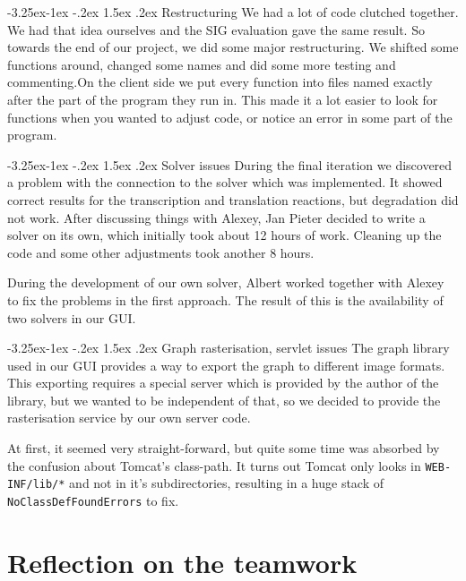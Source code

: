 \documentclass[a4paper]{article}
\makeatletter
\renewcommand\paragraph{\@startsection{paragraph}{4}{\z@}%
  {-3.25ex\@plus -1ex \@minus -.2ex}%
  {1.5ex \@plus .2ex}%
  {\normalfont\normalsize\bfseries}}
\makeatother
\begin{document}
\paragraph{Restructuring}
We had a lot of code clutched together. We had that idea ourselves and the SIG evaluation gave the same result. So towards the end of our project, we did some major restructuring. We shifted some functions around, changed some names and did some more testing and commenting.On the client side we put every function into files named exactly after the part of the program they run in. This made it a lot easier to look for functions when you wanted to adjust code, or notice an error in some part of the program. 

\paragraph{Solver issues}
During the final iteration we discovered a problem with the connection to the solver which was implemented. It showed correct results for the transcription and translation reactions, but degradation did not work. After discussing things with Alexey, Jan Pieter decided to write a solver on its own, which initially took about 12 hours of work. Cleaning up the code and some other adjustments took another 8 hours.

During the development of our own solver, Albert worked together with Alexey to fix the problems in the first approach. The result of this is the availability of two solvers in our GUI.

\paragraph{Graph rasterisation, servlet issues}
The graph library used in our GUI provides a way to export the graph to different image formats. This exporting requires a special server which is provided by the author of the library, but we wanted to be independent of that, so we decided to provide the rasterisation service by our own server code.

At first, it seemed very straight-forward, but quite some time was absorbed by the confusion about Tomcat's class-path. It turns out Tomcat only looks in \verb|WEB-INF/lib/*| and not in it's subdirectories, resulting in a huge stack of \verb|NoClassDefFoundErrors| to fix.


\section{Reflection on the teamwork}
\end{document}

